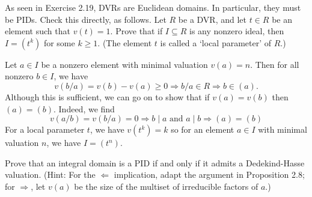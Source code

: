 \documentclass[../../master.tex]{subfiles}
\begin{document}
    \begin{problem}
        As seen in Exercise 2.19, DVRs are Euclidean domains. In particular,
        they must be PIDs. Check this directly, as follows. Let $R$ be a DVR,
        and let $t \in R$ be an element such that $v(t) = 1$. Prove that if $I
        \subseteq R$ is any nonzero ideal, then $I = (t^{k})$ for some $k \geq
        1$. (The element $t$ is called a `local parameter' of $R$.)
    \end{problem}

    \begin{solution}
        Let $a \in I$ be a nonzero element with minimal valuation $v(a) = n$.
        Then for all nonzero $b \in I$, we have
        \[
            v(b / a) = v(b) - v(a) \geq 0 \Longrightarrow b / a \in R
            \Longrightarrow b \in (a).
        \] 
        Although this is sufficient, we can go on to show that if $v(a) = v(b)$
        then $(a) = (b)$. Indeed, we find
        \[
            v(a / b) = v(b / a) = 0 \Longrightarrow b \mid a \text{ and } a \mid
            b \Longrightarrow (a) = (b)
        \] 
        For a local parameter $t$, we have $v(t^{k}) = k$ so for an element $a
        \in I$ with minimal valuation $n$, we have $I = (t^{n})$.
    \end{solution}

    \begin{problem}
        Prove that an integral domain is a PID if and only if it admits a
        Dedekind-Hasse valuation. (Hint: For the $\Longleftarrow$ implication,
        adapt the argument in Proposition 2.8; for $\Longrightarrow$, let
        $v(a)$ be the size of the multiset of irreducible factors of $a$.)
    \end{problem}
\end{document}
